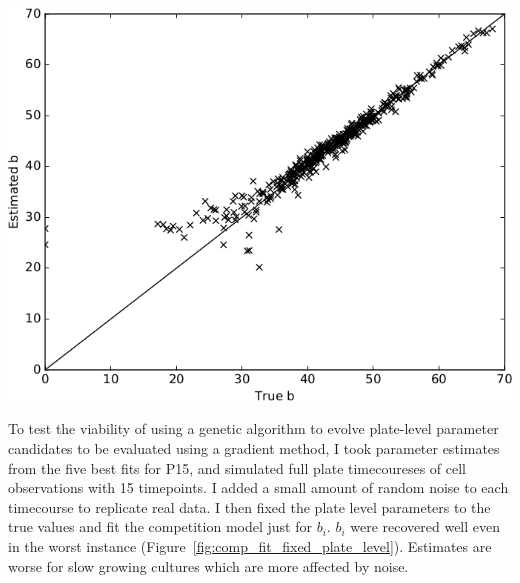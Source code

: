 \begin{multicols}{2}
\graphicspath{{images/genetic_algorithm/}}
\begin{Figure}
  \centering
  \includegraphics[width=\linewidth]{final/est_b_vs_true_b}
  \label{fig:comp_fit_fixed_plate_level}
\end{Figure}

To test the viability of using a genetic algorithm to evolve
plate-level parameter candidates to be evaluated using a gradient
method, I took parameter estimates from the five best fits for P15,
and simulated full plate timecoureses of cell observations with 15
timepoints. I added a small amount of random noise to each timecourse
to replicate real data. I then fixed the plate level parameters to the
true values and fit the competition model just for
\(b_{i}\). \(b_{i}\) were recovered well even in the worst instance
(Figure~\ref{fig:comp_fit_fixed_plate_level}). Estimates are worse for
slow growing cultures which are more affected by noise.



\end{multicols}
